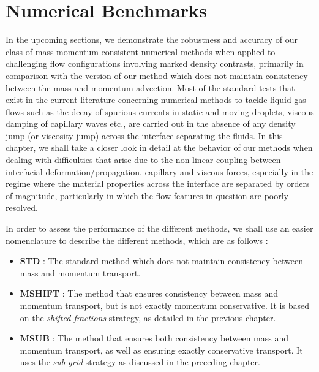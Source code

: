 \setchapterpreamble[u]{\margintoc}
\chapter{Numerical Benchmarks}

In the upcoming sections, we demonstrate the robustness and accuracy of our class of mass-momentum consistent numerical methods when applied to challenging flow configurations involving marked density contrasts, primarily in comparison with the version of our method which does not maintain consistency between the mass and momentum advection. Most of the standard tests that exist in the current literature concerning numerical methods to tackle liquid-gas flows such as the decay of spurious currents in static and moving droplets, viscous damping of capillary waves etc., are carried out in the absence of any density jump (or viscosity jump) across the interface separating the fluids. In this chapter, we shall take a closer look in detail at the behavior of our methods when dealing with difficulties that arise due to the non-linear coupling between interfacial deformation/propagation, capillary and viscous forces, especially in the regime where the material properties across the interface are separated by orders of magnitude, particularly in which the flow features in question are poorly resolved. 

In order to assess the performance of the different methods, we shall use an easier nomenclature to describe the different methods, which are as follows : 

\begin{itemize}
	\item \textbf{STD} : The standard method which does not maintain consistency between mass and momentum transport. 
	\item \textbf{MSHIFT} : The method that ensures consistency between mass and momentum transport, 
		but is not exactly momentum conservative. 
		It is based on the \textit{shifted fractions} strategy, 
		as detailed in the previous chapter. 
	\item \textbf{MSUB} : The method that ensures both consistency between mass and momentum transport, as well as ensuring exactly conservative transport. It uses the \textit{sub-grid} strategy as discussed in the preceding chapter. 
\end{itemize}


